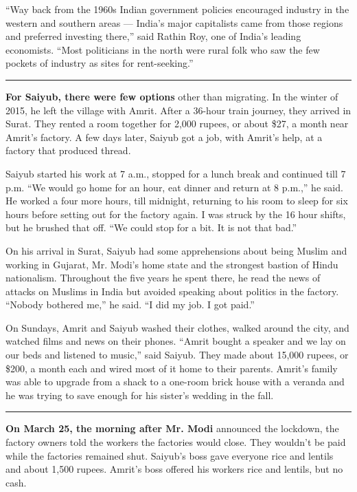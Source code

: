 ``Way back from the 1960s Indian government policies encouraged industry
in the western and southern areas --- India's major capitalists came
from those regions and preferred investing there,'' said Rathin Roy, one
of India's leading economists. ``Most politicians in the north were
rural folk who saw the few pockets of industry as sites for
rent-seeking.''

\begin{center}\rule{0.5\linewidth}{\linethickness}\end{center}

\textbf{For Saiyub, there were few options} other than migrating. In the
winter of 2015, he left the village with Amrit. After a 36-hour train
journey, they arrived in Surat. They rented a room together for 2,000
rupees, or about \$27, a month near Amrit's factory. A few days later,
Saiyub got a job, with Amrit's help, at a factory that produced thread.

Saiyub started his work at 7 a.m., stopped for a lunch break and
continued till 7 p.m. ``We would go home for an hour, eat dinner and
return at 8 p.m.,'' he said. He worked a four more hours, till midnight,
returning to his room to sleep for six hours before setting out for the
factory again. I was struck by the 16 hour shifts, but he brushed that
off. ``We could stop for a bit. It is not that bad.''

On his arrival in Surat, Saiyub had some apprehensions about being
Muslim and working in Gujarat, Mr. Modi's home state and the strongest
bastion of Hindu nationalism. Throughout the five years he spent there,
he read the news of attacks on Muslims in India but avoided speaking
about politics in the factory. ``Nobody bothered me,'' he said. ``I did
my job. I got paid.''

On Sundays, Amrit and Saiyub washed their clothes, walked around the
city, and watched films and news on their phones. ``Amrit bought a
speaker and we lay on our beds and listened to music,'' said Saiyub.
They made about 15,000 rupees, or \$200, a month each and wired most of
it home to their parents. Amrit's family was able to upgrade from a
shack to a one-room brick house with a veranda and he was trying to save
enough for his sister's wedding in the fall.

\begin{center}\rule{0.5\linewidth}{\linethickness}\end{center}

\textbf{On March 25, the morning after Mr. Modi} announced the lockdown,
the factory owners told the workers the factories would close. They
wouldn't be paid while the factories remained shut. Saiyub's boss gave
everyone rice and lentils and about 1,500 rupees. Amrit's boss offered
his workers rice and lentils, but no cash.

